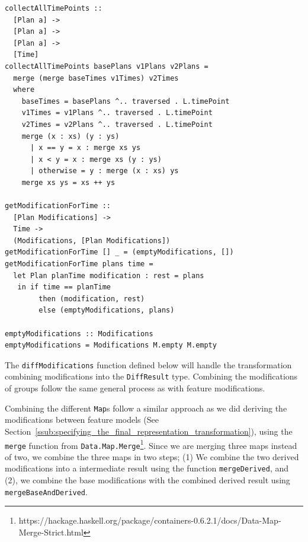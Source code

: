 \documentclass[a4paper,english]{ifimaster}
\begin{document}
\begin{verbatim}
collectAllTimePoints ::
  [Plan a] ->
  [Plan a] ->
  [Plan a] ->
  [Time]
collectAllTimePoints basePlans v1Plans v2Plans =
  merge (merge baseTimes v1Times) v2Times
  where
    baseTimes = basePlans ^.. traversed . L.timePoint
    v1Times = v1Plans ^.. traversed . L.timePoint
    v2Times = v2Plans ^.. traversed . L.timePoint
    merge (x : xs) (y : ys)
      | x == y = x : merge xs ys
      | x < y = x : merge xs (y : ys)
      | otherwise = y : merge (x : xs) ys
    merge xs ys = xs ++ ys

getModificationForTime ::
  [Plan Modifications] ->
  Time ->
  (Modifications, [Plan Modifications])
getModificationForTime [] _ = (emptyModifications, [])
getModificationForTime plans time =
  let Plan planTime modification : rest = plans
   in if time == planTime
        then (modification, rest)
        else (emptyModifications, plans)

emptyModifications :: Modifications
emptyModifications = Modifications M.empty M.empty
\end{verbatim}

The \texttt{diffModifications} function defined below will handle the transformation combining modifications into the \texttt{DiffResult} type. Combining the modifications of groups follow the same general process as with feature modifications. 

Combining the different \texttt{Map}s follow a similar approach as we did deriving the modifications between feature models (See Section~\vref{ssub:specifying_the_final_representation_transformation}), using the \texttt{merge} function from \texttt{Data.Map.Merge}\footnote{https://hackage.haskell.org/package/containers-0.6.2.1/docs/Data-Map-Merge-Strict.html}. Since we are merging three maps instead of two, we combine the three maps in two steps; (1) We combine the two derived modifications into a intermediate result using the function \texttt{mergeDerived}, and (2), we combine the base modifications with the combined derived result using \texttt{mergeBaseAndDerived}.
\end{document}
